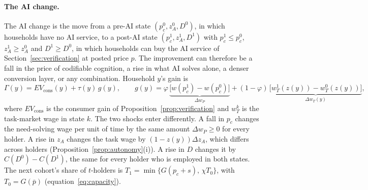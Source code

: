 \documentclass[12pt]{article}
\theoremstyle{remark}
\begin{document}
\paragraph{The AI change.} The AI change is the move from a pre-AI state $(p_c^0,z_A^0,D^0)$, in which households have no AI service, to a post-AI state $(p_c^1,z_A^1,D^1)$ with $p_c^1\le p_c^0$, $z_A^1\ge z_A^0$ and $D^1\ge D^0$, in which households can buy the AI service of Section~\ref{sec:verification} at posted price $p$. The improvement can therefore be a fall in the price of codifiable cognition, a rise in what AI solves alone, a denser conversion layer, or any combination. Household $y$'s gain is
\begin{equation}\label{eq:G}
\Gamma(y)=EV_{\text{cons}}(y)+\tau(y)\,g(y),\qquad g(y)=\varphi\,\underbrace{\big[w(p_c^1)-w(p_c^0)\big]}_{\Delta w_P}+(1-\varphi)\,\underbrace{\big[w_T^1(z(y))-w_T^0(z(y))\big]}_{\Delta w_T(y)},
\end{equation}
where $EV_{\text{cons}}$ is the consumer gain of Proposition~\ref{prop:verification} and $w_T^k$ is the task-market wage in state $k$. The two shocks enter differently. A fall in $p_c$ changes the need-solving wage per unit of time by the same amount $\Delta w_P\ge0$ for every holder. A rise in $z_A$ changes the task wage by $(1-z(y))\Delta z_A$, which differs across holders (Proposition~\ref{prop:autonomy}(i)). A rise in $D$ changes it by $C(D^0)-C(D^1)$, the same for every holder who is employed in both states. The next cohort's share of $t$-holders is $T_1=\min\{G(p_c+s),\,\chi T_0\}$, with $T_0=G(\bar p)$ (equation~\eqref{eq:capacity}).
\end{document}
